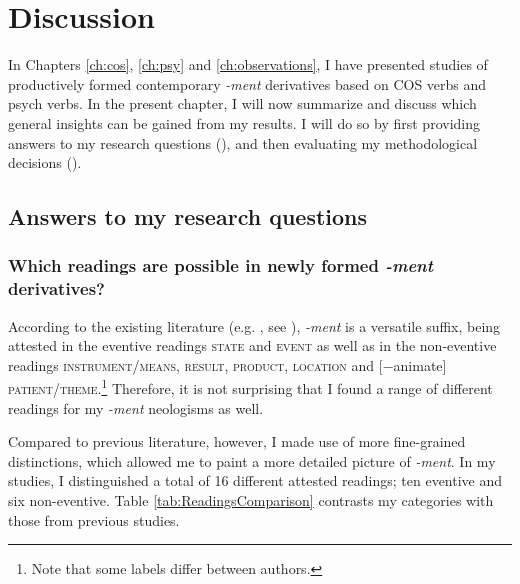 \chapter{Discussion}\label{ch:discussion}\largerpage

In Chapters \ref{ch:cos}, \ref{ch:psy} and \ref{ch:observations}, I have presented studies of productively formed contemporary \textit{-ment} derivatives based on COS verbs and psych verbs. 
In the present chapter, I will now summarize and discuss which general insights can be gained from my results. I will do so by first providing answers to my research questions (), and then evaluating my methodological decisions ().

\section{Answers to my research questions}
\label{sec:disc-RQs}

\subsection{Which readings are possible in newly formed \textit{-ment} derivatives?}

According to the existing literature (e.g. \citealt{Bauer.2013,Lieber.2016}, see ), \textit{-ment} is a versatile suffix, being attested in the eventive readings \textsc{state} and \textsc{event} as well as in the non-eventive readings \textsc{in\-stru\-ment\slash means, result, product, location} and [−animate] \textsc{patient\slash theme}.\footnote{Note that some labels differ between authors.} Therefore, it is not surprising that I found a range of different readings for my \textit{-ment} neologisms as well. 

Compared to previous literature, however, I made use of more fine-grained distinctions, which allowed me to paint a more detailed picture of \textit{-ment}.
In my studies, I distinguished a total of 16 different attested readings; ten eventive and six non-eventive. Table \ref{tab:ReadingsComparison} contrasts my categories with those from previous studies. 

